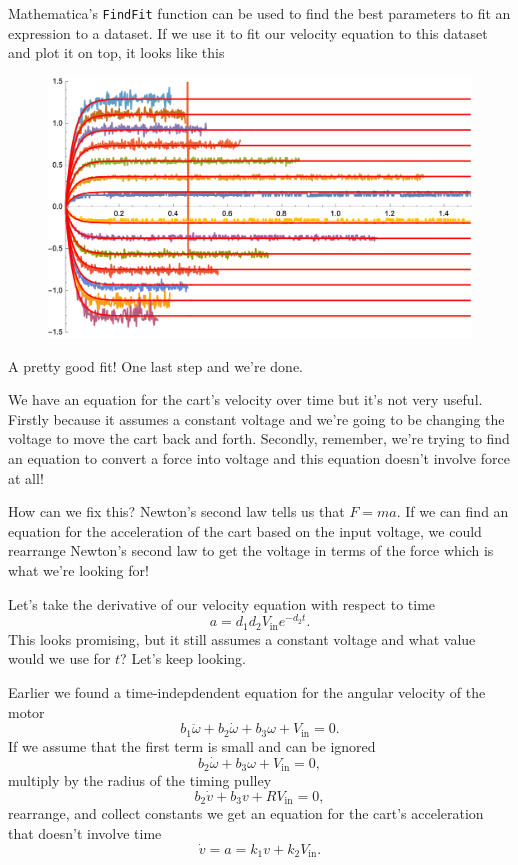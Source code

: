 \documentclass{article}
\begin{document}
Mathematica's \texttt{FindFit} function can be used to find the best parameters to fit an expression to a dataset. If we use it to fit our velocity equation to this dataset and plot it on top, it looks like this

\begin{figure}[H]
  \centering
  \includegraphics[width=\textwidth]{angular_velocities_fitted}
\end{figure}

A pretty good fit! One last step and we're done.

We have an equation for the cart's velocity over time but it's not very useful. Firstly because it assumes a constant voltage and we're going to be changing the voltage to move the cart back and forth. Secondly, remember, we're trying to find an equation to convert a force into voltage and this equation doesn't involve force at all!

How can we fix this? Newton's second law tells us that $F = m a$. If we can find an equation for the acceleration of the cart based on the input voltage, we could rearrange Newton's second law to get the voltage in terms of the force which is what we're looking for!

Let's take the derivative of our velocity equation with respect to time \[a = d_1 d_2 V_\text{in} e^{-d_2 t}.\] This looks promising, but it still assumes a constant voltage and what value would we use for $t$? Let's keep looking.

Earlier we found a time-indepdendent equation for the angular velocity of the motor \[b_1 \ddot{\omega} + b_2 \dot{\omega} + b_3 \omega + V_\text{in} = 0.\] If we assume that the first term is small and can be ignored \[b_2 \dot{\omega} + b_3 \omega + V_\text{in} = 0,\] multiply by the radius of the timing pulley \[b_2 \dot{v} + b_3 v + R V_\text{in} = 0,\] rearrange, and collect constants we get an equation for the cart's acceleration that doesn't involve time \[\dot{v} = a = k_1 v + k_2 V_\text{in}.\]
\end{document}
